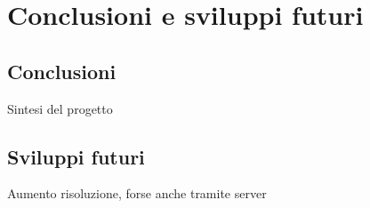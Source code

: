 \chapter{Conclusioni e sviluppi futuri}

\section{Conclusioni}

Sintesi del progetto

\section{Sviluppi futuri}

Aumento risoluzione, forse anche tramite server